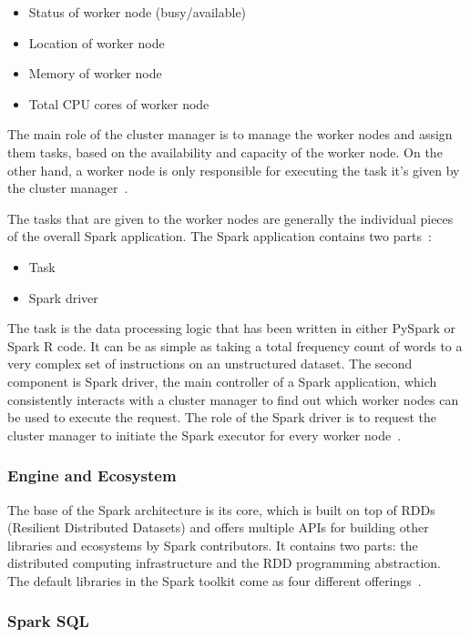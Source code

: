 \documentclass[]{final_report}
\begin{document}
\begin{itemize}
    \item Status of worker node (busy/available)
    \item Location of worker node
    \item Memory of worker node
    \item Total CPU cores of worker node
\end{itemize}

The main role of the cluster manager is to manage the worker nodes and assign them tasks, based on the availability and capacity of the worker node. On the other hand, a worker node is only responsible for executing the task it’s given by the cluster manager~\cite{singh_manage_2022}.

The tasks that are given to the worker nodes are generally the individual pieces of the overall Spark application. The Spark application contains two parts~\cite{singh_manage_2022}:

\begin{itemize}
    \item Task
    \item Spark driver
\end{itemize}

The task is the data processing logic that has been written in either PySpark or Spark R code. It can be as simple as taking a total frequency count of words to a very complex set of instructions on an unstructured dataset. The second component is Spark driver, the main controller of a Spark application, which consistently interacts with a cluster manager to find out which worker nodes can be used to execute the request. The role of the Spark driver is to request the cluster manager to initiate the Spark executor for every worker node~\cite{singh_manage_2022}.

\subsubsection{Engine and Ecosystem}

The base of the Spark architecture is its core, which is built on top of RDDs (Resilient Distributed Datasets) and offers multiple APIs for building other libraries and ecosystems by Spark contributors. It contains two parts: the distributed computing infrastructure and the RDD programming abstraction. The default libraries in the Spark toolkit come as four different offerings~\cite{singh_manage_2022}.

\subsubsection{Spark SQL}
\end{document}

